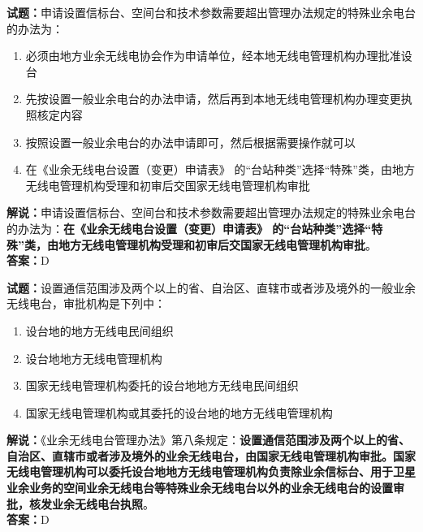 \documentclass{ctexbook}
\begin{document}
\textbf{试题：}申请设置信标台、空间台和技术参数需要超出管理办法规定的特殊业余电台的办法为：
\begin{enumerate}[leftmargin=3em]
  \item 必须由地方业余无线电协会作为申请单位，经本地无线电管理机构办理批准设台
  \item 先按设置一般业余电台的办法申请，然后再到本地无线电管理机构办理变更执照核定内容
  \item 按照设置一般业余电台的办法申请即可，然后根据需要操作就可以
  \item 在《业余无线电台设置（变更）申请表》 的“台站种类”选择“特殊”类，由地方无线电管理机构受理和初审后交国家无线电管理机构审批
\end{enumerate}
\noindent\textbf{解说：}申请设置信标台、空间台和技术参数需要超出管理办法规定的特殊业余电台的办法为：\textbf{在《业余无线电台设置（变更）申请表》 的“台站种类”选择“特殊”类，由地方无线电管理机构受理和初审后交国家无线电管理机构审批}。\\\noindent\textbf{答案：}D


\vspace{1em}

\textbf{试题：}设置通信范围涉及两个以上的省、自治区、直辖市或者涉及境外的一般业余无线电台，审批机构是下列中：
\begin{enumerate}[leftmargin=3em]
  \item 设台地的地方无线电民间组织
  \item 设台地地方无线电管理机构
  \item 国家无线电管理机构委托的设台地地方无线电民间组织
  \item 国家无线电管理机构或其委托的设台地的地方无线电管理机构
\end{enumerate}
\noindent\textbf{解说：}《业余无线电台管理办法》第八条规定：\textbf{设置通信范围涉及两个以上的省、自治区、直辖市或者涉及境外的业余无线电台，由国家无线电管理机构审批。国家无线电管理机构可以委托设台地地方无线电管理机构负责除业余信标台、用于卫星业余业务的空间业余无线电台等特殊业余无线电台以外的业余无线电台的设置审批，核发业余无线电台执照}。\\\noindent\textbf{答案：}D

\vspace{1em}
\end{document}
